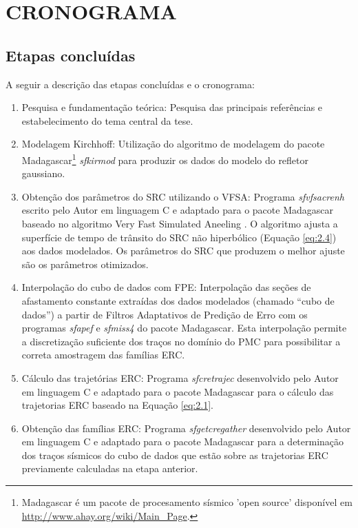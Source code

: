 \chapter{CRONOGRAMA}
\label{cap9:cronograma}


\section{Etapas concluídas}

A seguir a descrição das etapas concluídas e o cronograma:

  \begin{enumerate}
   \item  Pesquisa e fundamentação teórica: Pesquisa das principais referências e estabelecimento do tema central da tese.
   \item   Modelagem Kirchhoff: Utilização do algoritmo de modelagem do pacote Madagascar\footnote{Madagascar é um pacote
   de procesamento sísmico 'open source' disponível em \url{http://www.ahay.org/wiki/Main_Page}.}
   \textit{sfkirmod} para produzir os dados do modelo do refletor
   gaussiano.
    \item Obtenção dos parâmetros do SRC utilizando o VFSA: Programa \textit{sfvfsacrenh} escrito  pelo Autor
    em linguagem C e adaptado para o pacote Madagascar
   baseado no algoritmo Very Fast Simulated Aneeling \cite{ingber}. O algoritmo ajusta a superfície de tempo de trânsito
   do SRC não hiperbólico (Equação \ref{eq:2.4}) aos dados modelados. Os parâmetros do SRC que produzem o melhor ajuste são
   os parâmetros otimizados.
    \item  Interpolação do cubo de dados com FPE: Interpolação das seções de afastamento constante extraídas dos dados modelados
    (chamado ``cubo de dados'') a partir de Filtros Adaptativos de Predição de Erro
    com os programas \textit{sfapef} e \textit{sfmiss4} do pacote Madagascar.
    Esta interpolação permite a discretização
    suficiente dos traços no domínio do PMC para possibilitar a correta amostragem das famílias ERC.
    \item  Cálculo das trajetórias ERC: Programa \textit{sfcretrajec} desenvolvido pelo Autor em linguagem C 
    e adaptado para o pacote Madagascar para
    o cálculo das trajetorias ERC baseado na Equação \ref{eq:2.1}.
     \item Obtenção das famílias ERC: Programa \textit{sfgetcregather} desenvolvido pelo Autor em linguagem C 
     e adaptado para o pacote Madagascar para a
     determinação dos traços sísmicos do cubo de dados que estão sobre as trajetorias ERC previamente calculadas na etapa anterior.

\end{enumerate}
